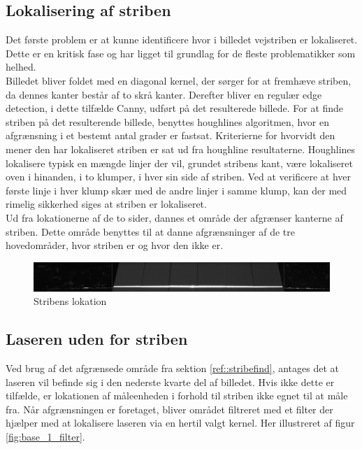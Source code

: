 \subsection{Lokalisering af striben\label{ref::stribefind}}
Det første problem er at kunne identificere hvor i billedet vejstriben er lokaliseret. Dette er en kritisk fase og har ligget til grundlag for de fleste problematikker som helhed.
\\
Billedet bliver foldet med en diagonal kernel, der sørger for at fremhæve striben, da dennes kanter består af to skrå kanter.
Derefter bliver en regulær edge detection, i dette tilfælde Canny, udført på det resulterede billede. For at finde striben på det resulterende billede, benyttes houghlines algoritmen, hvor en afgrænsning i et bestemt antal grader er fastsat. Kriterierne for hvorvidt den mener den har lokaliseret striben er sat ud fra houghline resultaterne. Houghlines lokalisere typisk en mængde linjer der vil, grundet stribens kant, være lokaliseret oven i hinanden, i to klumper, i hver sin side af striben.
Ved at verificere at hver første linje i hver klump skær med de andre linjer i samme klump, kan der med rimelig sikkerhed siges at striben er lokaliseret.
\\
Ud fra lokationerne af de to sider, dannes et område der afgrænser kanterne af striben. Dette område benyttes til at danne afgrænsninger af de tre hovedområder, hvor striben er og hvor den ikke er.

\begin{figure}[h]
	\centering
	\includegraphics[width=0.8\linewidth]{Billeder/_1_normal}
	\caption{Stribens lokation}
	\label{fig:1normal}
\end{figure}

\newpage

\subsection{Laseren uden for striben}
Ved brug af det afgrænsede område fra sektion \ref{ref::stribefind}, antages det at laseren vil befinde sig i den nederste kvarte del af billedet. Hvis ikke dette er tilfælde, er lokationen af måleenheden i forhold til striben ikke egnet til at måle fra.
Når afgrænsningen er foretaget, bliver området filtreret med et filter der hjælper med at lokalisere laseren via en hertil valgt kernel. Her illustreret af figur \ref{fig:base_1_filter}.

